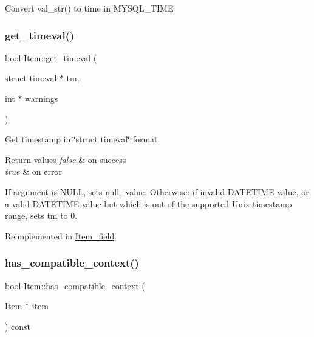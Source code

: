 Convert val\+\_\+str() to time in M\+Y\+S\+Q\+L\+\_\+\+T\+I\+ME \mbox{\label{classItem_aa04fbf99d5b417b78536362654daff73}} 
\subsubsection{\texorpdfstring{get\+\_\+timeval()}{get\_timeval()}}
{\footnotesize\ttfamily bool Item\+::get\+\_\+timeval (\begin{DoxyParamCaption}\item[{struct timeval $\ast$}]{tm,  }\item[{int $\ast$}]{warnings }\end{DoxyParamCaption})\hspace{0.3cm}{\ttfamily [virtual]}}

Get timestamp in \char`\"{}struct timeval\char`\"{} format. 
\begin{DoxyRetVals}{Return values}
{\em false} & on success \\
\hline
{\em true} & on error\\
\hline
\end{DoxyRetVals}
If argument is N\+U\+LL, sets null\+\_\+value. Otherwise\+: if invalid D\+A\+T\+E\+T\+I\+ME value, or a valid D\+A\+T\+E\+T\+I\+ME value but which is out of the supported Unix timestamp range, sets \textquotesingle{}tm\textquotesingle{} to 0. 

Reimplemented in \mbox{\hyperlink{classItem__field_a1b77cc2e083b73e7f7640a0633be6312}{Item\+\_\+field}}.

\mbox{\label{classItem_a7e19bfc78f1c2b4e50a82e4876e0eea8}} 
\subsubsection{\texorpdfstring{has\+\_\+compatible\+\_\+context()}{has\_compatible\_context()}}
{\footnotesize\ttfamily bool Item\+::has\+\_\+compatible\+\_\+context (\begin{DoxyParamCaption}\item[{\mbox{\hyperlink{classItem}{Item}} $\ast$}]{item }\end{DoxyParamCaption}) const\hspace{0.3cm}{\ttfamily [inline]}}

